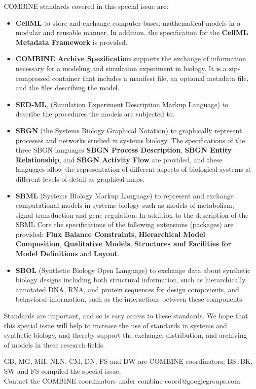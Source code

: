 \documentclass{jib}
\begin{document}
COMBINE standards covered in this special issue are:
\begin{itemize}
\item {\bf CellML} to store and exchange computer-based mathematical models in a modular and reusable manner. In addition, the specification for the {\bf CellML Metadata Framework} is provided.

\item {\bf COMBINE Archive Spezification} supports the exchange of information necessary for a modeling and simulation experiment in biology. It is a zip-compressed container that includes a manifest file, an optional metadata file, and the files describing the model. 

\item {\bf SED-ML}, (Simulation Experiment Description Markup Language) to describe the procedures the models are subjected to.

\item {\bf SBGN} (the Systems Biology Graphical Notation) to graphically represent processes and networks studied in systems biology. The specifications of the three SBGN languages {\bf SBGN Process Description}, {\bf SBGN Entity Relationship}, and {\bf SBGN Activity Flow} are provided, and these languages allow the representation of different aspects of biological systems at different levels of detail as  graphical maps.

\item {\bf SBML} (Systems Biology Markup Language) to represent and exchange computational models in systems biology such as models of metabolism, signal transduction and gene regulation. In addition to the description of the SBML Core the specifications of the following extensions (packages) are provided:  {\bf Flux Balance Constraints}, {\bf Hierarchical Model Composition}, {\bf Qualitative Models}, {\bf Structures and Facilities for Model Definitions} and {\bf Layout}.

\item {\bf SBOL} (Synthetic Biology Open Language) to exchange data about synthetic biology designs including both structural information, such as hierarchically annotated DNA, RNA, and protein sequences for design components, and behavioral information, such as the interactions between these components. 
\end{itemize}

Standards are important, and so is easy access to these standards. We hope that this special issue will help to increase the use of standards in systems and synthetic biology, and thereby support the exchange, distribution, and archiving  of models in these research fields.

\vspace*{1.5cm}

GB, MG, MH, NLN, CM, DN, FS and DW are COMBINE coordinators; BS, BK, SW and FS compiled the special issue. \\
Contact the COMBINE coordinators under combine-coord@googlegroups.com



\end{document}
